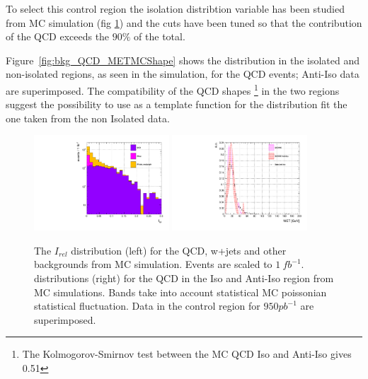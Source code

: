 To select this control region the isolation distribtion variable has been studied from MC simulation (fig \ref{fig:bkg_QCD_IsoShape})
and the cuts have been tuned so that the contribution of the QCD exceeds the $90\%$ of the total.

%

Figure~\ref{fig:bkg_QCD_METMCShape} shows the \MET distribution in the isolated and non-isolated regions, 
as seen in the simulation, for the QCD events; Anti-Iso data are superimposed. 
The compatibility of the QCD shapes \footnote{The Kolmogorov-Smirnov test between the MC QCD Iso and Anti-Iso gives 0.51} 
in the two regions suggest the possibility to use as a template function for the \MET distribution fit the one taken 
from the non Isolated data. 

\begin{figure}[h]
  \begin{center}
    \includegraphics[width=0.45\textwidth]{plots/bkg_IsoStack.pdf}
    \includegraphics[width=0.45\textwidth]{plots/bkg_IsoShape.pdf}
    \caption{The $I_{rel}$ distribution (left) for the QCD, w+jets and other backgrounds from MC simulation. 
             Events are scaled to $1\ fb^{-1}$. \MET distributions (right) for the QCD in the Iso and Anti-Iso region 
             from MC simulations. Bands take into account statistical MC poissonian statistical fluctuation.
             Data in the control region for $950 pb^{-1}$ are superimposed.}
  \label{fig:bkg_QCD_IsoShape}
  \end{center}
\end{figure}

